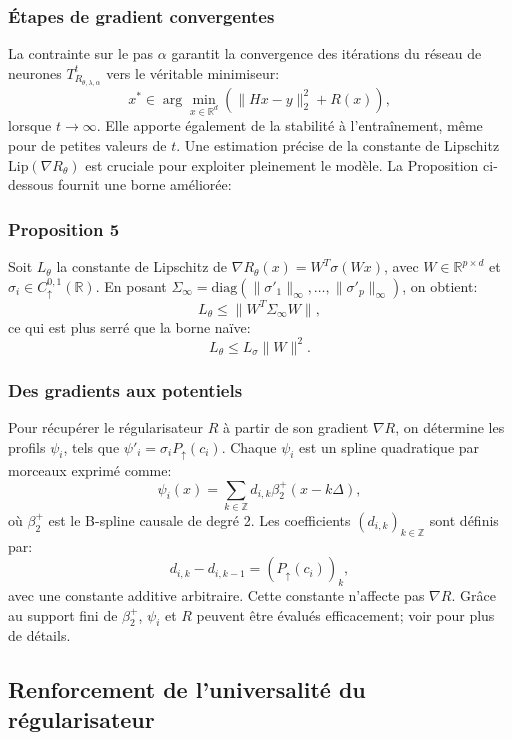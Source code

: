\documentclass[a4paper, 12pt]{report} %
\begin{document}
\subsubsection{Étapes de gradient convergentes}

La contrainte sur le pas \( \alpha \) garantit la convergence des itérations du réseau de neurones \( T_{R_{\theta, \lambda, \alpha}}^t \) vers le véritable minimiseur:
\[
x^* \in \arg \min_{x \in \mathbb{R}^d} \left( \| Hx - y \|_2^2 + R(x) \right),
\]
lorsque \( t \to \infty \). Elle apporte également de la stabilité à l'entraînement, même pour de petites valeurs de \( t \). Une estimation précise de la constante de Lipschitz \( \text{Lip}(\nabla R_\theta) \) est cruciale pour exploiter pleinement le modèle. La Proposition ci-dessous fournit une borne améliorée:

\subsubsection*{Proposition 5}
Soit \( L_\theta \) la constante de Lipschitz de \( \nabla R_\theta(x) = W^T \sigma(Wx) \), avec \( W \in \mathbb{R}^{p \times d} \) et \( \sigma_i \in C^{0,1}_{\uparrow}(\mathbb{R}) \). En posant \( \Sigma_\infty = \text{diag}(\|\sigma'_1\|_\infty, \ldots, \|\sigma'_p\|_\infty) \), on obtient:
\[
L_\theta \leq \|W^T \Sigma_\infty W\|,
\]
ce qui est plus serré que la borne naïve:
\[
L_\theta \leq L_\sigma \|W\|^2.
\]

\subsubsection{Des gradients aux potentiels}

Pour récupérer le régularisateur \( R \) à partir de son gradient \( \nabla R \), on détermine les profils \( \psi_i \), tels que \( \psi'_i = \sigma_i P_{\uparrow}(c_i) \). Chaque \( \psi_i \) est un spline quadratique par morceaux exprimé comme:
\[
\psi_i(x) = \sum_{k \in \mathbb{Z}} d_{i,k} \beta_2^+ \left( x - k \Delta \right),
\]
où \( \beta_2^+ \) est le B-spline causale de degré 2. Les coefficients \( (d_{i,k})_{k \in \mathbb{Z}} \) sont définis par:
\[
d_{i,k} - d_{i,k-1} = (P_{\uparrow}(c_i))_k,
\]
avec une constante additive arbitraire. Cette constante n’affecte pas \( \nabla R \). Grâce au support fini de \( \beta_2^+ \), \( \psi_i \) et \( R \) peuvent être évalués efficacement; voir \cite{unser1999splines} pour plus de détails.

\subsection{Renforcement de l'universalité du régularisateur}
\end{document}
